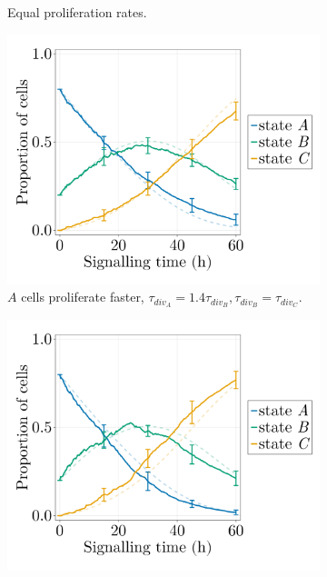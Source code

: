 \begin{figure}[ht]
\begin{subfigure}{0.47\textwidth}
        \caption{Equal proliferation rates.}
        \label{fig:diff-prolif-proportions-eq}
    \end{subfigure}
    \begin{subfigure}{0.47\textwidth}
        \centering
        \includegraphics[width=\textwidth]{figures/411/411-adhesion-proportions-7ite-prolif-a.png}
        \caption{$A$ cells proliferate faster, $\tau_{div_A}=1.4\tau_{div_B}, \tau_{div_B}=\tau_{div_C}$.}
        \label{fig:diff-prolif-proportions-a}
    \end{subfigure}
    \hfill
    \begin{subfigure}{0.47\textwidth}
        \centering
        \includegraphics[width=\textwidth]{figures/411/411-adhesion-proportions-7ite-prolif-b.png}

\end{subfigure}
\end{figure}
